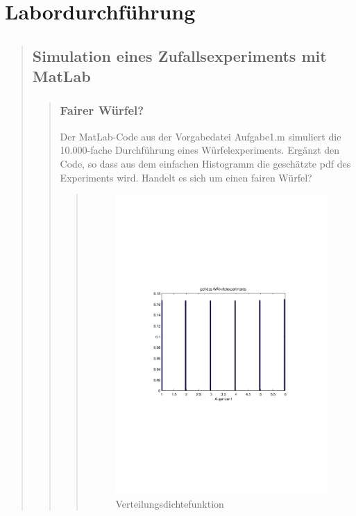 \section{Labordurchführung}
\begin{quote}
    
    \subsection{Simulation eines Zufallsexperiments mit MatLab}
    \begin{quote}
        
        \subsubsection{Fairer Würfel?}
        Der MatLab-Code aus der Vorgabedatei Aufgabe1.m simuliert die 10.000-fache Durchführung eines Würfelexperiments. Ergänzt
        den Code, so dass aus dem einfachen Histogramm die geschätzte pdf des Experiments wird. Handelt es sich um einen fairen
        Würfel?
        
        \begin{quote}
            \begin{figure}[H]
            \centering
                \includegraphics[scale=0.7, trim = 20mm 80mm 20mm 90mm, clip]{Bilder/fairer_wuerfel}
                    \caption{Verteilungsdichtefunktion}
                    \label{fig:fairer_wuerfel}
            \end{figure}
            

\end{quote}
\end{quote}
\end{quote}
